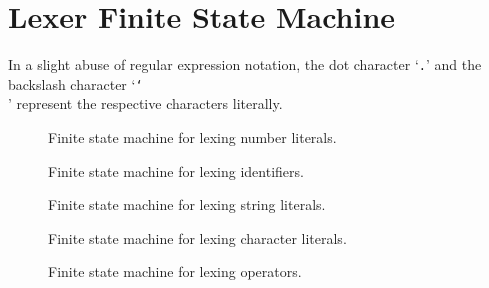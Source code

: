 \documentclass[../00-main.tex]{subfiles}
\begin{document}
\chapter{Lexer Finite State Machine}\label{app:lexer fsm}

In a slight abuse of regular expression notation, the dot character `\texttt{.}' and the backslash character `\texttt{\char`\\}' represent the respective characters literally.

\begin{figure}[ht]
  \centering
  \caption{Finite state machine for lexing number literals.}
  \label{app:fig:lexing numbers fsm} %
\end{figure}

\begin{figure}[ht]
  \centering
  \caption{Finite state machine for lexing identifiers.}
  \label{app:fig:lexing identifiers fsm} %
\end{figure}

\begin{figure}[ht]
  \centering
  \caption{Finite state machine for lexing string literals.}
  \label{app:fig:lexing strings fsm} %
\end{figure}

\begin{figure}[ht]
  \centering
  \caption{Finite state machine for lexing character literals.}
  \label{app:fig:lexing chars fsm} %
\end{figure}

\begin{figure}[ht]
  \centering
  \caption{Finite state machine for lexing operators.}
  \label{app:fig:lexing operators fsm} %
\end{figure}
\end{document}
